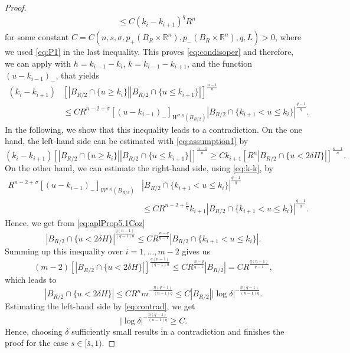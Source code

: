 \documentclass[11pt]{amsart}
\theoremstyle{plain}
\theoremstyle{definition}
\numberwithin{equation}{section}
\begin{document}
\begin{proof}
\begin{equation}
\begin{split}
&\leq C(k_{i} - k_{i+1})^q R^n
\end{split}
\end{equation}
for some constant $C=C(n, s, \sigma, p_+(B_R \times \mathbb{R}^n), p_-(B_R \times \mathbb{R}^n), q, L) > 0$, where we used \eqref{eq:P1} in the last inequality. This proves \eqref{eq:condisoper} and therefore, we can apply \cite[Proposition 5.1]{Coz17} with $h=k_{i-1}-k_i$, $k=k_{i-1}-k_{i+1}$, and the function $(u-k_{i-1})_-$, that yields
\begin{equation}\label{eq:aplProp5.1Coz}
\begin{aligned} 
(k_{i}-k_{i+1})& \left[ |B_{R/2}\cap \{ u \geq k_i\}||B_{R/2}\cap \{ u \leq k_{i+1}\}| \right]^{\frac{n-1}{n}} \\
&\leq CR^{n-2+\sigma} [(u-k_{i-1})_{-}]_{W^{\sigma,q}(B_{R/2})} \left|B_{R/2}\cap \{k_{i+1} < u \leq k_i\}\right|^{\frac{q-1}{q}}.
\end{aligned}
\end{equation}
In the following, we show that this inequality leads to a contradiction.
On the one hand, the left-hand side can be estimated with \eqref{eq:assumption1} by
\[ (k_{i}-k_{i+1}) \left[ |B_{R/2}\cap \{ u \geq k_i\}||B_{R/2}\cap \{ u \leq k_{i+1}\}| \right]^{\frac{n-1}{n}} \geq Ck_{i+1}\left[R^n|B_{R/2}\cap \{ u < 2\delta H\}|\right]^{\frac{n-1}{n}}.\]
On the other hand, we can estimate the right-hand side, using \eqref{eq:k-k}, by
\begin{align*}
 R^{n-2+\sigma} [(u-k_{i-1})_{-}]_{W^{\sigma,q}(B_{R/2})}& \left|B_{R/2}\cap \{k_{i+1} < u \leq k_i\}\right|^{\frac{q-1}{q}} \\
 & \leq  CR^{n-2+\frac{n}{q}} k_{i+1} \left|B_{R/2}\cap \{k_{i+1} < u \leq k_i\}\right|^{\frac{q-1}{q}}.
 \end{align*}
Hence, we get from \eqref{eq:aplProp5.1Coz}
\[ |B_{R/2}\cap \{ u < 2\delta H\}|^{\frac{q(n-1)}{(q-1)n}}\leq CR^{\frac{n-q}{q-1}}\left|B_{R/2}\cap \{k_{i+1} < u \leq k_i\}\right|. \]
Summing up this inequality over $i=1,\dots,m-2$ gives us
\[ (m-2)\left[|B_{R/2}\cap \{ u < 2\delta H\}|\right]^{\frac{q(n-1)}{(q-1)n}}\leq CR^{\frac{n-q}{q-1}}\left|B_{R/2}\right| = CR^{\frac{q(n-1)}{q-1}}, \]
which leads to
\[ |B_{R/2}\cap \{ u < 2\delta H\}|\leq CR^{n}m^{-\frac{n(q-1)}{(n-1)q}} \leq C|B_{R/2}| |\log \delta|^{-\frac{n(q-1)}{(n-1)q}}. \]
Estimating the left-hand side by \eqref{eq:contrad}, we get
\[ |\log \delta|^{-\frac{n(q-1)}{(n-1)q}} \geq C. \]
Hence, choosing $\delta$ sufficiently small results in a contradiction and finishes the proof for the case $s\in [\bar{s},1)$. 


\end{proof}
\end{document}
